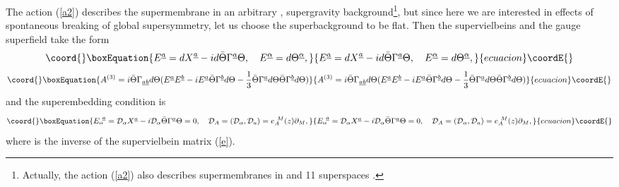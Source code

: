 \documentclass[a4paper,12pt]{article}
\begin{document}
The action (\ref{a2}) describes the supermembrane in an arbitrary
\coordHE{}, \coordHE{} supergravity background\footnote{Actually, the action (\ref{a2})
also describes supermembranes in \coordHE{} and 11 superspaces
\cite{pst}.}, but since here we are interested in effects of
spontaneous breaking of global supersymmetry, let us choose the
superbackground to be flat. Then the supervielbeins and the gauge
superfield take the form
\begin{equation}\coord{}\boxEquation{\label{calE}
{E}^{\underline a}={dX}^{\underline
a}-id\bar\Theta\Gamma^{\underline{a}}\Theta, \quad
E^{\underline\alpha}=d\Theta^{\underline\alpha},
}{{E}^{\underline a}={dX}^{\underline
a}-id\bar\Theta\Gamma^{\underline{a}}\Theta, \quad
E^{\underline\alpha}=d\Theta^{\underline\alpha},
}{ecuacion}\coordE{}\end{equation}
\begin{equation}\coord{}\boxEquation{\label{Aflat}
A^{(3)}=i\bar\Theta\Gamma_{\underline{ab}}d\Theta({
E}^{\underline a}{E}^{\underline b}-i{E}^{\underline a}
\bar\Theta\Gamma^{\underline{b}}d\Theta-
{1\over
3}\bar\Theta\Gamma^{\underline{a}}d\Theta\bar\Theta\Gamma^{\underline{b}}d\Theta)
}{A^{(3)}=i\bar\Theta\Gamma_{\underline{ab}}d\Theta({
E}^{\underline a}{E}^{\underline b}-i{E}^{\underline a}
\bar\Theta\Gamma^{\underline{b}}d\Theta-
{1\over
3}\bar\Theta\Gamma^{\underline{a}}d\Theta\bar\Theta\Gamma^{\underline{b}}d\Theta)
}{ecuacion}\coordE{}\end{equation}
and the superembedding condition is
\begin{equation}\coord{}\boxEquation{\label{embflat}
{E}^{~\underline a}_\alpha={\cal D}_\alpha X^{\underline
a}-i{\cal D}_\alpha\bar\Theta\Gamma^{\underline a}\Theta=0, \quad
{\cal D}_A=({\cal D}_\alpha, {\cal D}_a)=e^{~M}_{A}(z)\partial_M,
}{{E}^{~\underline a}_\alpha={\cal D}_\alpha X^{\underline
a}-i{\cal D}_\alpha\bar\Theta\Gamma^{\underline a}\Theta=0, \quad
{\cal D}_A=({\cal D}_\alpha, {\cal D}_a)=e^{~M}_{A}(z)\partial_M,
}{ecuacion}\coordE{}\end{equation}
where \coordHE{} is the inverse of the supervielbein matrix
(\ref{e}).
\end{document}
